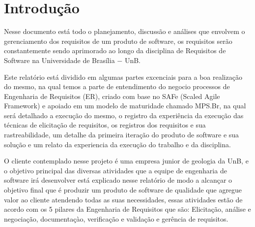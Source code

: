 \chapter{Introdução}

  Nesse documento está todo o planejamento, discussão e análises que envolvem o gerenciamento dos requisitos de um produto de
  software, os requisitos serão constantemente sendo aprimorado ao longo da disciplina de Requisitos de Software na Universidade
  de Brasília $-$ UnB.

  Este relatório está dividido em algumas partes excenciais para a boa realização do mesmo, na qual temos a parte de entendimento do negocio
  processos de Engenharia de Requisitos (ER), criado com base no SAFe (Scaled Agile Framework) e apoiado em um modelo de maturidade chamado
  MPS.Br, na qual será detalhado a execução do mesmo, o registro da experiência da execução das técnicas de elicitação de requisitos, os
  registros dos requisitos e sua rastreabilidade, um detalhe da primeira iteração do produto de software e sua solução e um relato da
  experiencia da execução do trabalho e da disciplina.

  O cliente contemplado nesse projeto é uma empresa junior de geologia da UnB, e o objetivo principal das diversas atividades que a
  equipe de engenharia de software irá desenvolver está explicado nesse relatório de modo a alcançar o objetivo final que é produzir
  um produto de software de qualidade que agregue valor ao cliente atendendo todas as suas necessidades, essas atividades estão de
  acordo com os 5 pilares da Engenharia de Requisitos que são: Elicitação, análise e negociação, documentaçào, verificação e validação
  e gerência de requisitos.

